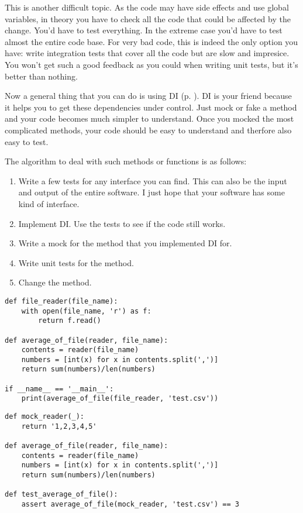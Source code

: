 This is another difficult topic. As the code may have side effects and use global variables, in theory you have to check all the code that could be affected by the change. You'd have to test everything. In the extreme case you'd have to test almost the entire code base. For very bad code, this is indeed the only option you have: write integration tests that cover all the code but are slow and impresice. You won't get such a good feedback as you could when writing unit tests, but it's better than nothing.

Now a general thing that you can do is using DI (p. \pageref{sec:dependency_injection}). DI is your friend because it helps you to get these dependencies under control. Just mock or fake a method and your code becomes much simpler to understand. Once you mocked the most complicated methods, your code should be easy to understand and therfore also easy to test.

The algorithm to deal with such methods or functions is as follows:
\begin{enumerate}
    \item Write a few tests for any interface you can find. This can also be the input and output of the entire software. I just hope that your software has some kind of interface.
    \item Implement DI. Use the tests to see if the code still works.
    \item Write a mock for the method that you implemented DI for.
    \item Write unit tests for the method.
    \item Change the method.
\end{enumerate}


\begin{programcode}{}
\begin{verbatim}
def file_reader(file_name):
    with open(file_name, 'r') as f:
        return f.read()

def average_of_file(reader, file_name):
    contents = reader(file_name)
    numbers = [int(x) for x in contents.split(',')]
    return sum(numbers)/len(numbers)

if __name__ == '__main__':
    print(average_of_file(file_reader, 'test.csv'))
\end{verbatim}
\end{programcode}


\begin{programcode}{}
\begin{verbatim}
def mock_reader(_):
    return '1,2,3,4,5'

def average_of_file(reader, file_name):
    contents = reader(file_name)
    numbers = [int(x) for x in contents.split(',')]
    return sum(numbers)/len(numbers)

def test_average_of_file():
    assert average_of_file(mock_reader, 'test.csv') == 3
\end{verbatim}
\end{programcode}
 
